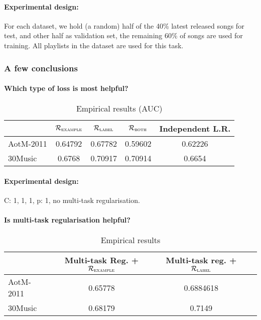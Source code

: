 \paragraph{Experimental design:}
For each dataset, we hold (a random) half of the 40\% latest released songs for test,
and other half as validation set, the remaining 60\% of songs are used for training.
All playlists in the dataset are used for this task.


\subsubsection{A few conclusions}

\paragraph{Which type of loss is most helpful?}
\begin{table}[!h]
\centering
\caption{Empirical results (AUC)}
\begin{tabular}{l|cccc}
\toprule
{}            & $\mathcal{R}_\textsc{example}$ & $\mathcal{R}_\textsc{label}$ & $\mathcal{R}_\textsc{both}$ & Independent L.R. \\
\midrule
AotM-2011     & 0.64792  & 0.67782 & 0.59602  & 0.62226 \\
30Music       & 0.6768   & 0.70917 & 0.70914  & 0.6654 \\
\bottomrule
\end{tabular}
\end{table}

\paragraph{Experimental design:}
C: 1, 1, 1, p: 1, no multi-task regularisation.

\paragraph{Is multi-task regularisation helpful?}

\begin{table}[!h]
\centering
\caption{Empirical results}
\begin{tabular}{l|ccc}
\toprule
{}            & Multi-task Reg. + $\mathcal{R}_\textsc{example}$ & Multi-task reg. + $\mathcal{R}_\textsc{label}$ \\
\midrule
AotM-2011     & 0.65778     & 0.6884618 \\
30Music       & 0.68179     & 0.7149 \\
\bottomrule
\end{tabular}
\end{table}



